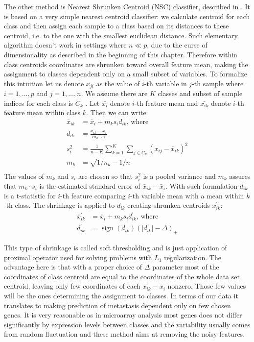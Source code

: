 \documentclass[shortabstract, english, mgr]{iithesis}
\begin{document}
The other method is Nearest Shrunken Centroid (NSC) classifier, described in \cite{NSC}. It is based on a very simple nearest centroid classifier: we calculate centroid for each class and then assign each sample to a class based on its distances to these centroid, i.e. to the one with the smallest euclidean distance. Such elementary algorithm doesn't work in settings where $n \ll p$, due to the curse of dimensionality as described in the beginning of this chapter. Therefore within class centroids coordinates are shrunken toward overall feature mean, making the assignment to classes dependent only on a small subset of variables. To formalize this intuition let us denote $x_{ji}$ as the value of $i$-th variable in $j$-th sample where $i=1, \ldots, p$ and $j=1,\ldots,n$. We assume there are $K$ classes and subset of sample indices for each class is $C_k$ . Let $\bar{x_i}$ denote $i$-th feature mean and $\bar{x_{ik}}$ denote $i$-th feature mean within class $k$. Then we can write:
\begin{align*}
    \bar{x}_{i k}&=\bar{x}_{i}+m_{k} s_{i} d_{i k} \text{, where} \\
    d_{i k}&=\frac{\bar{x}_{i k}-\bar{x}_{i}}{m_{k} \cdot s_{i}} \\ 
    s_{i}^{2}&=\frac{1}{n-K} \sum_{k=1}^{K} \sum_{j \in C_{k}}\left(x_{i j}-\bar{x}_{i k}\right)^{2} \\
    m_{k}&=\sqrt{1 / n_{k}-1 / n} \\
\end{align*}
The values of $m_k$ and $s_i$ are chosen so that $s_i^2$ is a pooled variance and $m_k$ assures that $m_k \cdot s_i$ is the estimated standard error of $\bar{x}_{i k}-\bar{x}_{i}$. With such formulation $d_{ik}$ is a t-statistic for $i$-th feature comparing $i$-th variable mean with a mean within $k$-th class. The shrinkage is applied to $d_{ik}$ creating shrunken centroids $\bar{x}_{ik}^{\prime}$:
\begin{align*}
    \bar{x}_{i k}^{\prime}&=\bar{x}_{i}+m_{k} s_{i} d_{i k}^{\prime} \text{, where} \\
    d_{i k}^{\prime}&=\operatorname{sign}\left(d_{i k}\right)\left(\left|d_{i k}\right|-\Delta\right)_{+}
\end{align*}

This type of shrinkage is called soft thresholding and is just application of proximal operator used for solving problems with $L_1$ regularization. The advantage here is that with a proper choice of $\Delta$ parameter most of the coordinates of class centroid are equal to the coordinates of the whole data set centroid, leaving only few coordinates of each $\bar{x}_{i k}^{\prime} - \bar{x}_{i}$ nonzero. Those few values will be the ones determining the assignment to classes. In terms of our data it translates to making prediction of metastasis dependent only on few chosen genes. It is very reasonable as in microarray analysis most genes does not differ significantly by expression levels between classes and the variability usually comes from random fluctuation and these method aims at removing the noisy features.
\end{document}
